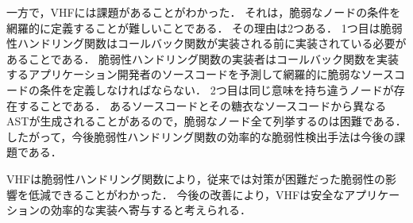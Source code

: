 \documentclass[a4paper,12pt]{jreport}
\begin{document}
一方で，VHFには課題があることがわかった．
それは，脆弱なノードの条件を網羅的に定義することが難しいことである．
その理由は2つある．
1つ目は脆弱性ハンドリング関数はコールバック関数が実装される前に実装されている必要があることである．
脆弱性ハンドリング関数の実装者はコールバック関数を実装するアプリケーション開発者のソースコードを予測して網羅的に脆弱なソースコードの条件を定義しなければならない．
2つ目は同じ意味を持ち違うノードが存在することである．
あるソースコードとその糖衣なソースコードから異なるASTが生成されることがあるので，脆弱なノード全て列挙するのは困難である．
したがって，今後脆弱性ハンドリング関数の効率的な脆弱性検出手法は今後の課題である．

VHFは脆弱性ハンドリング関数により，従来では対策が困難だった脆弱性の影響を低減できることがわかった．
今後の改善により，VHFは安全なアプリケーションの効率的な実装へ寄与すると考えられる．
\end{document}

